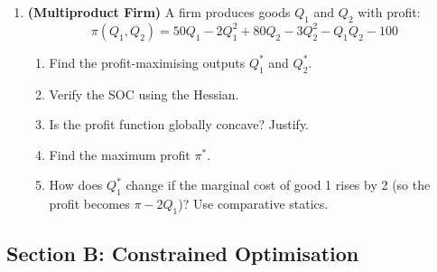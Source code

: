 \documentclass[12pt, a4paper]{article}
\theoremstyle{definition}
\begin{document}
\begin{enumerate}[label=\textbf{A\arabic*.}, leftmargin=2.5em]
\item \textbf{(Multiproduct Firm)}
A firm produces goods $Q_1$ and $Q_2$ with profit:
\[
  \pi(Q_1, Q_2) = 50Q_1 - 2Q_1^2 + 80Q_2 - 3Q_2^2 - Q_1Q_2 - 100
\]
\begin{enumerate}[label=(\alph*)]
  \item Find the profit-maximising outputs $Q_1^*$ and $Q_2^*$.
  \item Verify the SOC using the Hessian.
  \item Is the profit function globally concave? Justify.
  \item Find the maximum profit $\pi^*$.
  \item How does $Q_1^*$ change if the marginal cost of good 1 rises by 2
        (so the profit becomes $\pi - 2Q_1$)? Use comparative statics.
\end{enumerate}

\end{enumerate}

\subsection{Section B: Constrained Optimisation}
\end{document}
